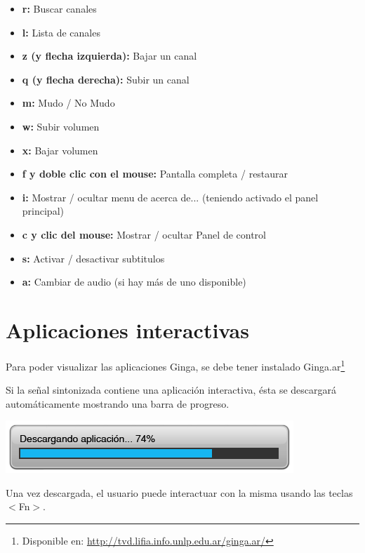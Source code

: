 \documentclass{article}
\begin{document}
\begin{itemize}
	\item \textbf{r:} Buscar canales
	\item \textbf{l:} Lista de canales
	\item \textbf{z (y flecha izquierda):} Bajar un canal
	\item \textbf{q (y flecha derecha):} Subir un canal
	\item \textbf{m:} Mudo / No Mudo	
	\item \textbf{w:} Subir volumen
	\item \textbf{x:} Bajar volumen
	\item \textbf{f y doble clic con el mouse:} Pantalla completa / restaurar
	\item \textbf{i:} Mostrar / ocultar menu de acerca de... (teniendo activado el panel principal)
	\item \textbf{c y clic del mouse:} Mostrar / ocultar Panel de control
	\item \textbf{s:} Activar / desactivar subtitulos
	\item \textbf{a:} Cambiar de audio (si hay más de uno disponible)
\end{itemize}

\section{Aplicaciones interactivas}

Para poder visualizar las aplicaciones Ginga, se debe tener instalado Ginga.ar\footnote{Disponible en: \url{http://tvd.lifia.info.unlp.edu.ar/ginga.ar/}}

Si la señal sintonizada contiene una aplicación interactiva, ésta se descargará automáticamente mostrando una barra de progreso. 

\vspace{0.5cm}
\centerline{\includegraphics[scale=0.85,keepaspectratio=true]{DescargandoApp}}

\vspace{0.5cm}
Una vez descargada, el usuario puede interactuar con la misma usando las teclas $<$Fn$>$.
\end{document}
